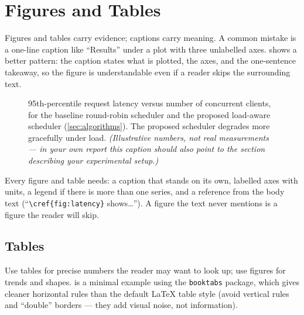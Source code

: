 \section{Figures and Tables}
\label{sec:figures}

Figures and tables carry evidence; captions carry meaning. A common
mistake is a one-line caption like ``Results'' under a plot with three
unlabelled axes.  shows a better pattern: the caption
states what is plotted, the axes, and the one-sentence takeaway, so the
figure is understandable even if a reader skips the surrounding text.

\begin{figure}[htbp]
  \centering
  \caption{95th-percentile request latency versus number of concurrent
  clients, for the baseline round-robin scheduler and the proposed
  load-aware scheduler (\cref{sec:algorithms}). The proposed scheduler
  degrades more gracefully under load. \emph{(Illustrative numbers, not
  real measurements --- in your own report this caption should also
  point to the section describing your experimental setup.)}}
  \label{fig:latency}
\end{figure}

\begin{tipbox}
Every figure and table needs: a caption that stands on its own, labelled
axes with units, a legend if there is more than one series, and a
reference from the body text (``\texttt{\textbackslash cref\{fig:latency\}}
shows\ldots''). A figure the text never mentions is a figure the reader
will skip.
\end{tipbox}

\subsection{Tables}
Use tables for precise numbers the reader may want to look up; use
figures for trends and shapes.  is a minimal
example using the \texttt{booktabs} package, which gives cleaner
horizontal rules than the default \LaTeX{} table style (avoid vertical
rules and ``double'' borders --- they add visual noise, not information).

